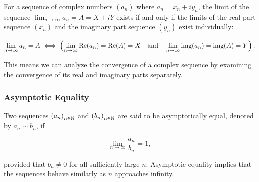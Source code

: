 For a sequence of complex numbers \((a_n)\) where \(a_n = x_n + i y_n\), the limit of the sequence 
\(\lim_{n \to \infty} a_n = A = X + i Y\) exists if and only if the limits of the real part sequence 
\((x_n)\) and the imaginary part sequence \((y_n)\) exist individually:

\[
    \lim_{n \to \infty} a_n = A \iff \left( \lim_{n \to \infty} \text{Re}(a_n) = \text{Re}(A) = X \quad \text{and} \quad \lim_{n \to \infty} \text{img}(a_n) = \text{img}(A) = Y \right).
\]

This means we can analyze the convergence of a complex sequence by examining the convergence of its real 
and imaginary parts separately.

\subsubsection{Asymptotic Equality}

Two sequences \({(a_n)}_{n \in \mathbb{N}}\) and \({(b_n)}_{n \in \mathbb{N}}\) are said to be 
asymptotically equal, denoted by \(a_n \sim b_n\), if

\[
    \lim_{n \to \infty} \frac{a_n}{b_n} = 1,
\]

provided that \(b_n \neq 0\) for all sufficiently large \(n\). Asymptotic equality implies that the sequences behave similarly as \(n\) approaches infinity.

